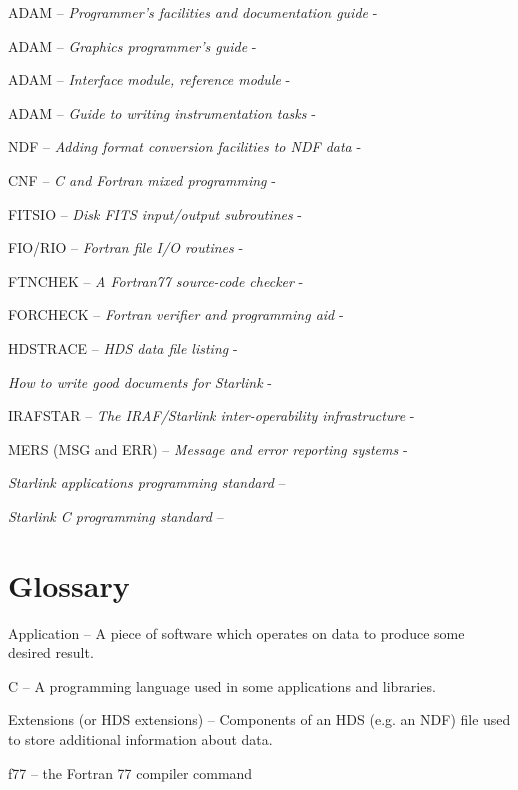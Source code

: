 ADAM -- {\em Programmer's facilities and documentation guide} - 

ADAM -- {\em Graphics programmer's guide} - 

ADAM -- {\em Interface module, reference module} - 

ADAM -- {\em Guide to writing instrumentation tasks} -

NDF -- {\em Adding format conversion facilities to NDF data} -

CNF -- {\em C and Fortran mixed programming} - 

FITSIO -- {\em Disk FITS input/output subroutines} - 

FIO/RIO -- {\em Fortran file I/O routines} - 

FTNCHEK -- {\em A Fortran77 source-code checker} - 

FORCHECK -- {\em Fortran verifier and programming aid} -

HDSTRACE -- {\em HDS data file listing}  - 

{\em How to write good documents for Starlink} - 

IRAFSTAR -- {\em The IRAF/Starlink inter-operability infrastructure} -

MERS (MSG and ERR) -- {\em Message and error reporting systems} -

{\em Starlink applications programming standard} -- 

{\em Starlink C programming standard} -- 

\section{Glossary}

{\sf Application} -- A piece of software which operates on data to
produce some desired result.

{\sf C} -- A programming language used in some applications and libraries.

{\sf Extensions (or HDS extensions)} -- Components of an HDS (e.g. an
NDF) file used to store additional information about data.

{\sf f77} -- the Fortran 77 compiler command

